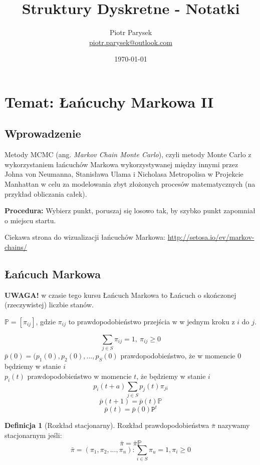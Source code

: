 \documentclass[a4paper,12pt]{article}
\title{Struktury Dyskretne - Notatki}
\author{Piotr Parysek\\
\href{mailto:piotr.parysek@outlook.com}{piotr.parysek@outlook.com} }
\date{\today}
\theoremstyle{definition}%
\theoremstyle{definition}
\newtheorem{definition}{Definicja}%
\theoremstyle{problem}
\begin{document}
\maketitle

\tableofcontents
\section[Wykład 8: 27-IV-2017 - Temat: Łańcuchy Markowa II]{Temat: Łańcuchy Markowa II}
\subsection{Wprowadzenie}
Metody MCMC (ang. \textit{Markov Chain Monte Carlo}), czyli metody Monte Carlo z wykorzystaniem łańcuchów Markowa wykorzystywanej między innymi przez Johna von Neumanna, Stanisława Ulama i Nicholasa Metropolisa w Projekcie Manhattan w celu za modelowania zbyt złożonych procesów matematycznych (na przykład obliczania całek).

\textbf{Procedura:} Wybierz punkt, {\color{green} poruszaj się losowo} tak, by {\color{red}szybko} punkt {\color{blue}zapomniał} o miejscu startu.


Ciekawa strona do wizualizacji łańcuchów Markowa: \url{http://setosa.io/ev/markov-chains/}
\subsection{Łańcuch Markowa}
\textbf{UWAGA!} w czasie tego kursu Łańcuch Markowa to Łańcuch o skończonej (rzeczywistej) liczbie stanów.

$\mathbb{P}=[\pi _{ij}]$, gdzie $\pi _{ij}$ to prawdopodobieństwo przejścia w w jednym kroku z $i$ do $j$.

$$\sum _{j\in S}\pi _{ij}=1,\ \pi _{ij}\geq 0$$
$\bar{p}(0)=(p_1(0),p_2(0),...,p_S(0)$ prawdopodobieństwo, że w momencie $0$ będziemy w stanie $i$\\
$p_i(t)$ prawdopodobieństwo w momencie $t$, że będziemy w stanie $i$\\
$$p_i(t+a)\sum _{j\in S}p_j(t)\pi _{ji}$$
$$\bar{p}(t+1)=\bar{p}(t)\mathbb{P}$$
$$\bar{p}(t)=\bar{p}(0)\mathtt{P}^t$$

\begin{definition}[Rozkład stacjonarny]\label{def:RozkladStacjonarny}
Rozkład prawdopodobieństwa $\bar{\pi}$ nazywamy stacjonarnym jeśli: $$\bar{\pi}=\bar{\pi}\mathbb{P}$$ 
$$\bar{\pi}=(\pi _1,\pi _2,..., \pi _n) : \sum _{i\in S}\pi _u =1, \pi _i \geq 0$$
\end{definition}
\end{document}

